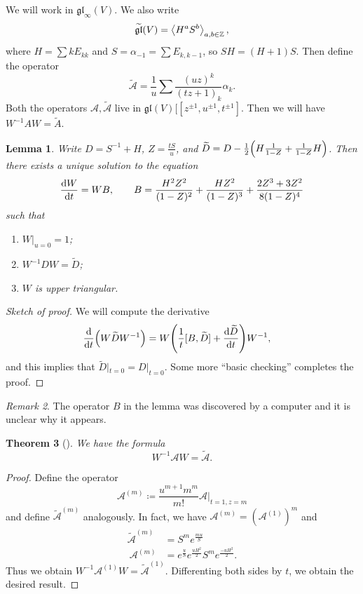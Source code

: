 \documentclass[leqno, openany]{memoir}
\newtheorem{thm}{Theorem}[section]
\newtheorem{lem}[thm]{Lemma}
\theoremstyle{definition}
\theoremstyle{remark}
\newtheorem{rmk}[thm]{Remark}
\theoremstyle{plain}
\theoremstyle{definition}
\theoremstyle{remark}
\newcommand{\Z}{\mathbb{Z}}
\newcommand{\mc}[1]{\mathcal{#1}}
\newcommand{\mf}[1]{\mathfrak{#1}}
\newcommand{\wt}[1]{\widetilde{#1}}
\begin{document}
We will work in $\mf{gl}_{\infty}(V)$. We also write 
\[ \wt{\mf{gl}}(V) = \ev{H^a S^b}_{a,b \in \Z}, \] 
where $H = \sum k E_{kk}$ and $S = \alpha_{-1} = \sum E_{k,k-1}$, so $SH = (H+1)S$. Then define the operator
\[ \wt{\mc{A}} = \frac{1}{u} \sum \frac{(uz)^k}{(tz+1)_k} \alpha_k. \]
Both the operators $\mc{A}, \wt{\mc{A}}$ live in $\mf{gl}(V)[[z^{\pm 1}, u^{\pm 1}, t^{\pm 1}]$. 
Then we will have $W^{-1}AW = \wt{A}$.

\begin{lem}
    Write $D = S^{-1} + H$, $Z = \frac{tS}{u}$, and $\wt{D} = D - \frac{1}{2} \qty(H \frac{1}{1-Z} + \frac{1}{1-Z}H)$. Then there exists a unique solution to the equation
    \[ \dv{W}{t} = WB, \qquad B = \frac{H^2 Z^2}{(1-Z)^2} + \frac{HZ^2}{(1-Z)^3} + \frac{2Z^3 + 3Z^2}{8(1-Z)^4} \]
    such that
    \begin{enumerate}
        \item $W |_{u=0} = 1$;
        \item $W^{-1} DW = \wt{D}$;
        \item $W$ is upper triangular.
    \end{enumerate}
\end{lem}

\begin{proof}[Sketch of proof]
    We will compute the derivative
    \begin{align*}
        \dv{t} (W \wt{D} W^{-1}) &= W \qty(\frac{1}{t} [B, \wt{D}] + \dv{\wt{D}}{t})W^{-1},
    \end{align*}
    and this implies that $\wt{D}|_{t=0} = D|_{t=0}$. Some more ``basic checking'' completes the proof.
\end{proof}

\begin{rmk}
    The operator $B$ in the lemma was discovered by a computer and it is unclear why it appears.
\end{rmk}

\begin{thm}[\cite{gwptdescendent}]
    We have the formula
    \[ W^{-1} \mc{A} W = \wt{\mc{A}}. \]
\end{thm}

\begin{proof}
    Define the operator
    \[ \mc{A}^{(m)} \coloneqq \frac{u^{m+1}m^m}{m!} \mc{A}|_{t=1,z=m} \]
    and define $\wt{\mc{A}}^{(m)}$ analogously. In fact, we have $\mc{A}^{(m)} = (\mc{A}^{(1)})^m$ and
    \begin{align*}
        \wt{\mc{A}}^{(m)} &= S^m e^{\frac{mu}{S}} \\\
        \mc{A}^{(m)} &= e^{\frac{u}{S}} e^{\frac{uH^2}{2}} S^m e^{\frac{-uH^2}{2}}.
    \end{align*}
    Thus we obtain $W^{-1} \mc{A}^{(1)} W = \wt{\mc{A}}^{(1)}$. Differenting both sides by $t$, we obtain the desired result.
\end{proof}
\end{document}
